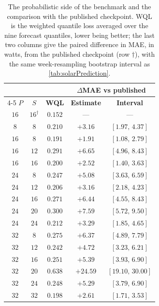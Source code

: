 \begin{table}[!tbp]
    \centering
    \small
    \renewcommand{\arraystretch}{1.1}
    \begin{tabular}{@{}ccccc@{}}
        \toprule
        & & & \multicolumn{2}{c}{\textbf{$\Delta$MAE vs published}} \\
        \cmidrule(l){4-5}
        \textbf{$P$} & \textbf{$S$} & \textbf{WQL} & \textbf{Estimate} & \textbf{Interval} \\
        \midrule
        $16$ & $16^{\dagger}$ & $0.152$ & --- & --- \\
        \midrule
        $8$ & $8$ & $0.210$ & $+3.16$ & $[1.97,\,4.37]$ \\
        \midrule
        $16$ & $8$ & $0.191$ & $+1.91$ & $[1.08,\,2.79]$ \\
        $16$ & $12$ & $0.291$ & $+6.65$ & $[4.96,\,8.43]$ \\
        $16$ & $16$ & $0.200$ & $+2.52$ & $[1.40,\,3.63]$ \\
        \midrule
        $24$ & $8$ & $0.247$ & $+5.08$ & $[3.63,\,6.59]$ \\
        $24$ & $12$ & $0.206$ & $+3.16$ & $[2.18,\,4.23]$ \\
        $24$ & $16$ & $0.271$ & $+6.44$ & $[4.55,\,8.43]$ \\
        $24$ & $20$ & $0.300$ & $+7.59$ & $[5.72,\,9.50]$ \\
        $24$ & $24$ & $0.212$ & $+3.29$ & $[1.85,\,4.65]$ \\
        \midrule
        $32$ & $8$ & $0.275$ & $+6.37$ & $[4.89,\,7.79]$ \\
        $32$ & $12$ & $0.242$ & $+4.72$ & $[3.23,\,6.21]$ \\
        $32$ & $16$ & $0.251$ & $+5.39$ & $[3.93,\,6.90]$ \\
        $32$ & $20$ & $0.638$ & $+24.59$ & $[19.10,\,30.00]$ \\
        $32$ & $24$ & $0.248$ & $+5.29$ & $[3.79,\,6.90]$ \\
        $32$ & $32$ & $0.198$ & $+2.61$ & $[1.71,\,3.53]$ \\
        \bottomrule
    \end{tabular}
\caption{The probabilistic side of the benchmark and the comparison with the published checkpoint. WQL is the weighted quantile loss averaged over the nine forecast quantiles, lower being better; the last two columns give the paired difference in MAE, in watts, from the published checkpoint (row $\dagger$), with the same week-resampling bootstrap interval as \autoref{tab:solarPrediction}.}%
    \label{tab:solarVsOfficial}
\end{table}
